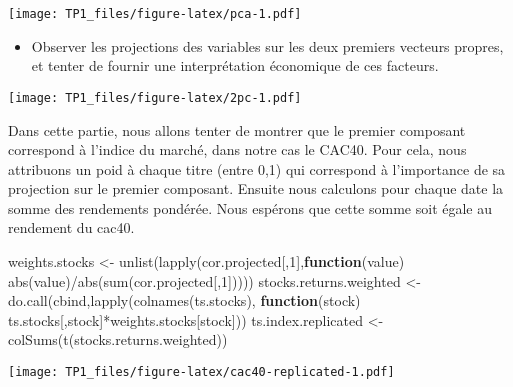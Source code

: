\documentclass[
]{article}
\newenvironment{Shaded}{\begin{snugshade}}{\end{snugshade}}
\newcommand{\ControlFlowTok}[1]{\textcolor[rgb]{0.13,0.29,0.53}{\textbf{#1}}}
\newcommand{\DecValTok}[1]{\textcolor[rgb]{0.00,0.00,0.81}{#1}}
\newcommand{\FloatTok}[1]{\textcolor[rgb]{0.00,0.00,0.81}{#1}}
\newcommand{\FunctionTok}[1]{\textcolor[rgb]{0.00,0.00,0.00}{#1}}
\newcommand{\NormalTok}[1]{#1}
\newcommand{\OtherTok}[1]{\textcolor[rgb]{0.56,0.35,0.01}{#1}}
\newcommand{\SpecialCharTok}[1]{\textcolor[rgb]{0.00,0.00,0.00}{#1}}
\providecommand{\tightlist}{%
  \setlength{\itemsep}{0pt}\setlength{\parskip}{0pt}}
\begin{document}
\texttt{[image: TP1\_files/figure-latex/pca-1.pdf]}

\begin{itemize}
\tightlist
\item
  Observer les projections des variables sur les deux premiers vecteurs
  propres, et tenter de fournir une interprétation économique de ces
  facteurs.
\end{itemize}

\begin{Shaded}
\end{Shaded}

\texttt{[image: TP1\_files/figure-latex/2pc-1.pdf]}

Dans cette partie, nous allons tenter de montrer que le premier
composant correspond à l'indice du marché, dans notre cas le CAC40. Pour
cela, nous attribuons un poid à chaque titre (entre 0,1) qui correspond
à l'importance de sa projection sur le premier composant. Ensuite nous
calculons pour chaque date la somme des rendements pondérée. Nous
espérons que cette somme soit égale au rendement du cac40.

\begin{Shaded}
\begin{Highlighting}[]
\NormalTok{weights.stocks }\OtherTok{\textless{}{-}} \FunctionTok{unlist}\NormalTok{(}\FunctionTok{lapply}\NormalTok{(cor.projected[,}\DecValTok{1}\NormalTok{],}\ControlFlowTok{function}\NormalTok{(value) }\FunctionTok{abs}\NormalTok{(value)}\SpecialCharTok{/}\FunctionTok{abs}\NormalTok{(}\FunctionTok{sum}\NormalTok{(cor.projected[,}\DecValTok{1}\NormalTok{]))))}
\NormalTok{stocks.returns.weighted }\OtherTok{\textless{}{-}} \FunctionTok{do.call}\NormalTok{(cbind,}\FunctionTok{lapply}\NormalTok{(}\FunctionTok{colnames}\NormalTok{(ts.stocks), }\ControlFlowTok{function}\NormalTok{(stock) ts.stocks[,stock]}\SpecialCharTok{*}\NormalTok{weights.stocks[stock]))}
\NormalTok{ts.index.replicated }\OtherTok{\textless{}{-}} \FunctionTok{colSums}\NormalTok{(}\FunctionTok{t}\NormalTok{(stocks.returns.weighted))}
\end{Highlighting}
\end{Shaded}

\texttt{[image: TP1\_files/figure-latex/cac40-replicated-1.pdf]}
\end{document}
